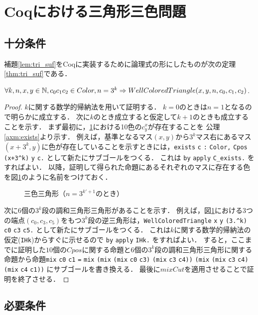 \section{Coqにおける三角形三色問題}

\subsection{十分条件}
補題\ref{lem:tri_suf}をCoqに実装するために論理式の形にしたものが次の定理\ref{thm:tri_suf}である．
\begin{thm} \label{thm:tri_suf}
  $\forall k, n, x, y \in \mathbb{N}, c_0 c_1 c_2 \in Color, n = 3 ^ k \Rightarrow WellColoredTriangle(x,y,n,c_0,c_1,c_2)$.
\end{thm}
\begin{proof}
  $k$に関する数学的帰納法を用いて証明する．
  $k=0$のときは$n=1$となるので明らかに成立する．
  次に$k$のとき成立すると仮定して$k+1$のときも成立することを示す．
  まず最初に，\ref{fig:suf_steps}における10色の$c^x_y$が存在することを
  公理\ref{axm:exists}より示す．
  例えば，基準となるマス$(x,y)$から$3^k$マス右にあるマス$(x+3^k,y)$に色が存在していることを示すときには，\verb|exists| \verb|c| \verb|:| \verb|Color,| \verb|Cpos| \verb|(x+3^k)| \verb|y| \verb|c.| として新たにサブゴールをつくる．
  これは \verb|by| \verb|apply| \verb|C_exists.| をすればよい．
  以降，証明して得られた命題にあるそれぞれのマスに存在する色を図\ref{fig:suf_steps}のように名前をつけておく．
  \begin{figure}[h]
    \centering
    
    \caption{三色三角形（$n=3^{k'+1}$のとき）}
    \label{fig:suf_steps}
  \end{figure} 
  次に$6$個の$3^k$段の調和三角形三角形があることを示す．
  例えば，図\ref{fig:suf_steps}における$3$つの端点$\left(c_{0},c_{3},c_{5}\right)$をもつ$3^k$段の逆三角形は，\verb|WellColoredTriangle| \verb|x| \verb|y| \verb|(3.^k)| \verb|c0| \verb|c3| \verb|c5.| として新たにサブゴールをつくる．
  これは$k$に関する数学的帰納法の仮定(\verb|IHk|)からすぐに示せるので \verb|by| \verb|apply| \verb|IHk.| をすればよい．
  すると，ここまでに証明した$10$個の$Cpos$に関する命題と$6$個の$3^k$段の調和三角形三角形に関する命題から命題\verb|mix| \verb|c0| \verb|c1| \verb|=| \verb|mix| \verb|(mix| \verb|(mix| \verb|c0| \verb|c3)| \verb|(mix| \verb|c3| \verb|c4))| \verb|(mix| \verb|(mix| \verb|c3| \verb|c4)| \verb|(mix| \verb|c4| \verb|c1))| にサブゴールを書き換える．
  最後に$mixCut$を適用させることで証明を終了させる．
\end{proof}


\subsection{必要条件}
